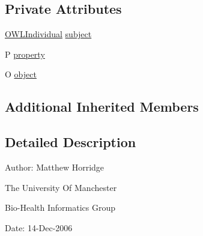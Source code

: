 \subsection*{Private Attributes}
\begin{DoxyCompactItemize}
\item 
\hyperlink{interfaceorg_1_1semanticweb_1_1owlapi_1_1model_1_1_o_w_l_individual}{O\-W\-L\-Individual} \hyperlink{classorg_1_1coode_1_1owlapi_1_1owlxmlparser_1_1_abstract_o_w_l_assertion_axiom_element_handler_3400ddbb774fad720b1e593f64f8eec5c_ae4e2e75193f17306c6ab9e01d654bac4}{subject}
\item 
P \hyperlink{classorg_1_1coode_1_1owlapi_1_1owlxmlparser_1_1_abstract_o_w_l_assertion_axiom_element_handler_3400ddbb774fad720b1e593f64f8eec5c_adc4b96acf3123175c2feb940e6fef30a}{property}
\item 
O \hyperlink{classorg_1_1coode_1_1owlapi_1_1owlxmlparser_1_1_abstract_o_w_l_assertion_axiom_element_handler_3400ddbb774fad720b1e593f64f8eec5c_a23d0b77f882861be12ecdc19b60641ca}{object}
\end{DoxyCompactItemize}
\subsection*{Additional Inherited Members}


\subsection{Detailed Description}
Author\-: Matthew Horridge\par
 The University Of Manchester\par
 Bio-\/\-Health Informatics Group\par
 Date\-: 14-\/\-Dec-\/2006\par
\par
 

